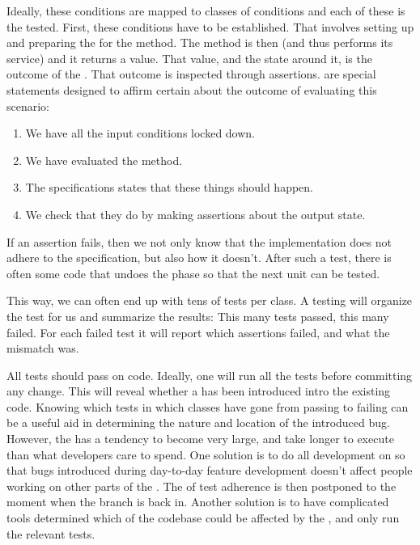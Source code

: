 Ideally, these conditions are mapped to classes of conditions and each of these is the tested. First, these conditions have to be established. That involves setting up  and preparing the  for the method. The method is then  (and thus performs its service) and it returns a value. That value, and the state around it, is the outcome of the . That outcome is inspected through assertions.  are special statements designed to affirm certain  about the outcome of evaluating this scenario:
\begin{enumerate}
  \item We have all the input conditions locked down.
  \item We have evaluated the method.
  \item The specifications states that these things should happen.
  \item We check that they do by making assertions about the output state.
\end{enumerate}
If an assertion fails, then we not only know that the implementation does not adhere to the specification, but also how it doesn't. After such a test, there is often some  code that undoes the  phase so that the next unit can be tested.

This way, we can often end up with tens of tests per class. A testing  will organize the test for us and summarize the results: This many tests passed, this many failed. For each failed test it will report which assertions failed, and what the mismatch was.

All tests should pass on  code. Ideally, one will run all the tests before committing any change. This will reveal whether a  has been introduced intro the existing code. Knowing which tests in which classes have gone from passing to failing can be a useful aid in determining the nature and location of the introduced bug. However, the  has a tendency to become very large, and take longer to execute than what developers care to spend. One solution is to do all development on  so that bugs introduced during day-to-day feature development doesn't affect people working on other parts of the . The  of test adherence is then postponed to the moment when the branch is  back in. Another solution is to have complicated  tools determined which  of the codebase could be affected by the , and only run the relevant tests.

